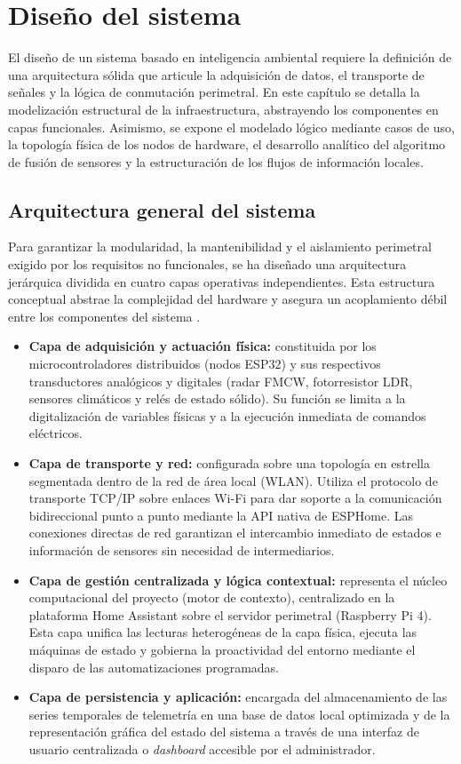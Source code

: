 \newpage
\section{Diseño del sistema}
\label{sec:diseno_sistema}

El diseño de un sistema basado en inteligencia ambiental requiere la definición de una arquitectura sólida que articule la adquisición de datos, el transporte de señales y la lógica de conmutación perimetral. En este capítulo se detalla la modelización estructural de la infraestructura, abstrayendo los componentes en capas funcionales. Asimismo, se expone el modelado lógico mediante casos de uso, la topología física de los nodos de hardware, el desarrollo analítico del algoritmo de fusión de sensores y la estructuración de los flujos de información locales.

\subsection{Arquitectura general del sistema}
Para garantizar la modularidad, la mantenibilidad y el aislamiento perimetral exigido por los requisitos no funcionales, se ha diseñado una arquitectura jerárquica dividida en cuatro capas operativas independientes. Esta estructura conceptual abstrae la complejidad del hardware y asegura un acoplamiento débil entre los componentes del sistema \cite{bass2012software}.

\begin{itemize}
    \item \textbf{Capa de adquisición y actuación física:} constituida por los microcontroladores distribuidos (nodos ESP32) y sus respectivos transductores analógicos y digitales (radar FMCW, fotorresistor LDR, sensores climáticos y relés de estado sólido). Su función se limita a la digitalización de variables físicas y a la ejecución inmediata de comandos eléctricos.
    \item \textbf{Capa de transporte y red:} configurada sobre una topolog\'ia en estrella segmentada dentro de la red de \'area local (WLAN). Utiliza el protocolo de transporte TCP/IP sobre enlaces Wi-Fi para dar soporte a la comunicaci\'on bidireccional punto a punto mediante la API nativa de ESPHome. Las conexiones directas de red garantizan el intercambio inmediato de estados e informaci\'on de sensores sin necesidad de intermediarios.
    \item \textbf{Capa de gestión centralizada y lógica contextual:} representa el núcleo computacional del proyecto (motor de contexto), centralizado en la plataforma Home Assistant sobre el servidor perimetral (Raspberry Pi 4). Esta capa unifica las lecturas heterogéneas de la capa física, ejecuta las máquinas de estado y gobierna la proactividad del entorno mediante el disparo de las automatizaciones programadas.
    \item \textbf{Capa de persistencia y aplicación:} encargada del almacenamiento de las series temporales de telemetría en una base de datos local optimizada y de la representación gráfica del estado del sistema a través de una interfaz de usuario centralizada o \textit{dashboard} accesible por el administrador.
\end{itemize}

